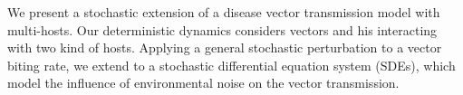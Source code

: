 	We present a stochastic extension of a disease vector transmission model with 
multi-hosts. Our deterministic dynamics considers vectors and his interacting 
with two kind of hosts. Applying a general stochastic perturbation 
to a vector biting rate, we extend to a stochastic differential 
equation system (SDEs), which model the influence of environmental noise on the 
vector transmission. 